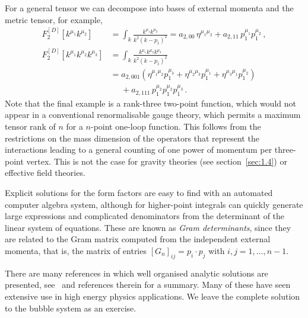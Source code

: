 For a general tensor we can decompose into bases of external momenta and the metric tensor, for example,
\begin{align}
  F^{[D]}_{2}[k^{\mu_1}k^{\mu_2}] &=  \int_k \frac{k^{\mu_1} k^{\mu_2}}{k^2 (k-p_1)^2} = a_{2,00} \, \eta^{\mu_1\mu_2} + a_{2,11} \, p_1^{\mu_1} p_1^{\mu_2}  \,,\label{eq:PVbubR2dec}\\
  F^{[D]}_{2}[k^{\mu_1}k^{\mu_2} k^{\mu_3}] &=  \int_k \frac{k^{\mu_1} k^{\mu_2}k^{\mu_3}}{k^2 (k-p_1)^2} \nonumber\\
  & = a_{2,001} \left( \eta^{\mu_1\mu_2} p_1^{\mu_3} + \eta^{\mu_2\mu_3} p_1^{\mu_1} + \eta^{\mu_3\mu_1} p_1^{\mu_2} \right) \nonumber\\
  & \phantom{= {}} + a_{2,111} \, p_1^{\mu_2} p_1^{\mu_2} p_1^{\mu_3} \,.
\label{eq:PVbubR3dec}
\end{align}
Note that the final example is a rank-three two-point function, which would not
appear in a conventional renormalisable gauge theory, which permits a maximum
tensor rank of $n$ for a $n$-point one-loop function. This follows from the
restrictions on the mass dimension of the operators that represent the
interactions leading to a general counting of one power of momentum per
three-point vertex. This is not the case for gravity theories (see section~\ref{sec:1.4}) or effective field theories.

Explicit solutions for the form factors are easy to find with an automated computer algebra
system, although for higher-point integrals can quickly generate large
expressions and complicated denominators from the determinant of the linear
system of equations. These are known as \emph{Gram determinants}, since they are
related to the Gram matrix computed from the independent external momenta, that is, the matrix of entries
$[G_n]_{ij} = p_i \cdot p_j$ with $i,j=1,\ldots,n-1$.

There are many references in which well organised analytic solutions are presented, see~\cite{ch3_Ellis:2011cr} and references therein for a summary. 
Many of these have seen extensive use in high energy physics applications. We leave the complete solution to the bubble system as an exercise.

